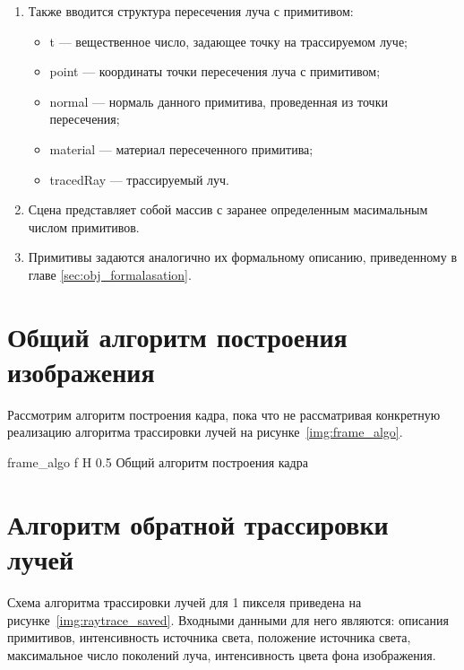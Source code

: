 \begin{enumerate}
	
	
	\item  Также вводится структура пересечения луча с примитивом:
	\begin{itemize}
		\item t --- вещественное число, задающее точку на трассируемом луче;
		\item point --- координаты точки пересечения луча с примитивом;
		\item normal --- нормаль данного примитива, проведенная из точки пересечения;
		\item material --- материал пересеченного примитива;
		\item tracedRay --- трассируемый луч.
	\end{itemize}
	
	\item Сцена представляет собой массив с заранее определенным масимальным числом примитивов.
	\item Примитивы задаются аналогично их формальному описанию, приведенному в главе \ref{sec:obj_formalasation}.
\end{enumerate}

\section{Общий алгоритм построения изображения}
Рассмотрим алгоритм построения кадра, пока что не рассматривая конкретную реализацию алгоритма трассировки лучей на рисунке~\ref{img:frame_algo}.




{frame_algo} %
{f} %
{H} %
{0.5\textwidth} %
{Общий алгоритм построения кадра} %







\section{Алгоритм обратной трассировки лучей}
Схема алгоритма трассировки лучей для 1 пикселя приведена на рисунке~\ref{img:raytrace_saved}. Входными данными для него являются: описания примитивов,
интенсивность источника света, положение источника света, максимальное число поколений луча, интенсивность цвета фона изображения.


